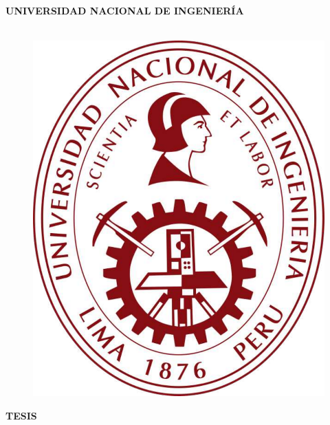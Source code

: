 \begin{titlepage}
	
	\begin{center}
		{\LARGE \textbf{UNIVERSIDAD NACIONAL DE INGENIERÍA}}\\
		\vspace{5 mm}
		{\large \textbf{\@facultad}}\\
		\vspace{5 mm}
		\begin{figure}[h]
			\centering 
			\includegraphics[scale=0.25]{E_IMAGENES/0_Caratula/UNI_LOGO1_GRANATE.pdf}
		\end{figure}
		\vspace{1 mm}	
		{\Large \textbf{TESIS} }\\
		\vspace{5 mm}
		
		\onehalfspacing  %
		{\Large \textbf{{\@titlecaratula}} }\\
		
		\singlespacing  %
		

\end{center}
\end{titlepage}
